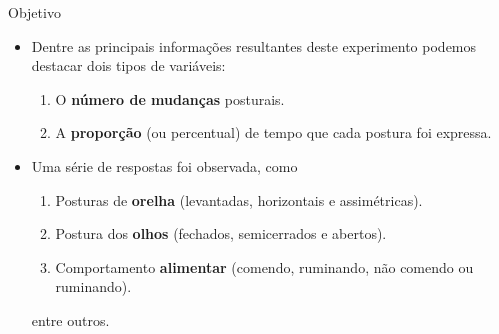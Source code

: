 \documentclass[
  ignorenonframetext,
  serif,
  professionalfont,
  usenames,
  dvipsnames,
  aspectratio = 169]{beamer}
\providecommand{\tightlist}{%
  \setlength{\itemsep}{0pt}\setlength{\parskip}{0pt}}
\renewcommand{\tightlist}{%
  \setlength{\itemsep}{0\baselineskip}
  \setlength{\parskip}{0.25\baselineskip}
}
\def\beginAHalfColumn{\begin{minipage}{0.49\textwidth}}%
\def\endColumns{\end{minipage}}%
\begin{document}
\begin{frame}{Objetivo}
\protect\hypertarget{objetivo-1}{}
\beginAHalfColumn

\begin{itemize}
\tightlist
\item
  Dentre as principais informações resultantes deste experimento podemos
  destacar dois tipos de variáveis:

  \begin{enumerate}
  \tightlist
  \item
    O \textbf{número de mudanças} posturais.
  \item
    A \textbf{proporção} (ou percentual) de tempo que cada postura foi
    expressa.
  \end{enumerate}
\end{itemize}

\endColumns
\beginAHalfColumn

\begin{itemize}
\tightlist
\item
  Uma série de respostas foi observada, como

  \begin{enumerate}
  \tightlist
  \item
    Posturas de \textbf{orelha} (levantadas, horizontais e
    assimétricas).
  \item
    Postura dos \textbf{olhos} (fechados, semicerrados e abertos).
  \item
    Comportamento \textbf{alimentar} (comendo, ruminando, não comendo ou
    ruminando).
  \end{enumerate}

  entre outros.
\end{itemize}

\endColumns
\end{frame}
\end{document}
